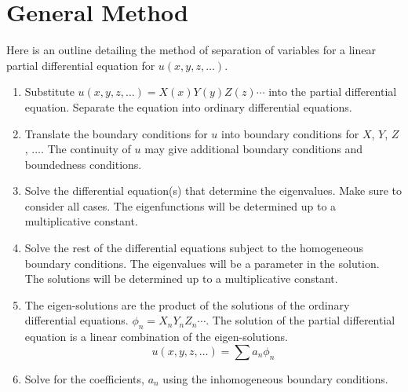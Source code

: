 \section{General Method}

Here is an outline detailing the method of separation of variables for
a linear partial differential equation for $u(x, y, z, \ldots)$.

\begin{enumerate}
\item
  Substitute $u(x, y, z, \ldots) = X(x) Y(y) Z(z) \cdots$ into the partial
  differential equation.  Separate the equation into ordinary differential
  equations.
\item
  Translate the boundary conditions for $u$ into boundary conditions for
  $X$, $Y$, $Z$, $\ldots$.  The continuity of $u$ may give additional boundary
  conditions and boundedness conditions.
\item
  Solve the differential equation(s) that determine the eigenvalues.
  Make sure to consider all cases.
  The eigenfunctions will be determined up to a multiplicative constant.
\item
  Solve the rest of the differential equations subject to the homogeneous
  boundary conditions.  The eigenvalues will be a parameter in the solution.
  The solutions will be determined up to a multiplicative constant.
\item
  The eigen-solutions are the product of the solutions of the ordinary
  differential equations.  $\phi_n = X_n Y_n Z_n \cdots$.
  The solution of the partial differential equation is a linear combination of
  the eigen-solutions.
  \[
  u(x,y,z,\ldots) = \sum a_n \phi_n
  \]
\item
  Solve for the coefficients, $a_n$ using the inhomogeneous boundary conditions.
\end{enumerate}




